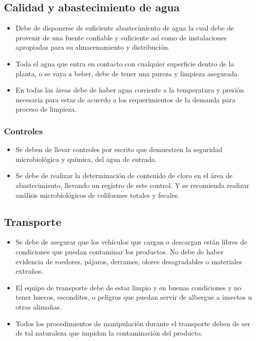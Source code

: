 \subsection{Calidad y abastecimiento de agua}

\begin{itemize}
	\item Debe de disponerse de suficiente abastecimiento de agua la cual debe de provenir de una fuente confiable y suficiente así como de instalaciones apropiadas para su almacenamiento y distribución.
	\item Toda el agua que entra en contacto con cualquier superficie dentro de la planta, o se vaya a beber, debe de tener una pureza y limpieza asegurada.
	\item En todas las áreas debe de haber agua corriente a la temperatura y presión necesaria para estar de acuerdo a los requerimientos de la demanda para proceso de limpieza.
\end{itemize}

\subsubsection{Controles}

\begin{itemize}
	\item Se deben de llevar controles por escrito que demuestren la seguridad microbiológica y química, del agua de entrada.
	\item Se debe de realizar la determinación de contenido de cloro en el área de abastecimiento, llevando un registro de este control. Y se recomienda realizar análisis microbiológicos de coliformes totales y fecales.
\end{itemize}

\subsection{Transporte}

\begin{itemize}
	\item Se debe de asegurar que los vehículos que cargan o descargan están libres de condiciones que puedan contaminar los productos. No debe de haber evidencia de roedores, pájaros, derrames, olores desagradables o materiales extraños.
	\item El equipo de transporte debe de estar limpio y en buenas condiciones y no tener huecos, escondites, o peligros que puedan servir de albergue a insectos u otras alimañas.
	\item Todos los procedimientos de manipulación durante el transporte deben de ser de tal naturaleza que impidan la contaminación del producto.
\end{itemize}

